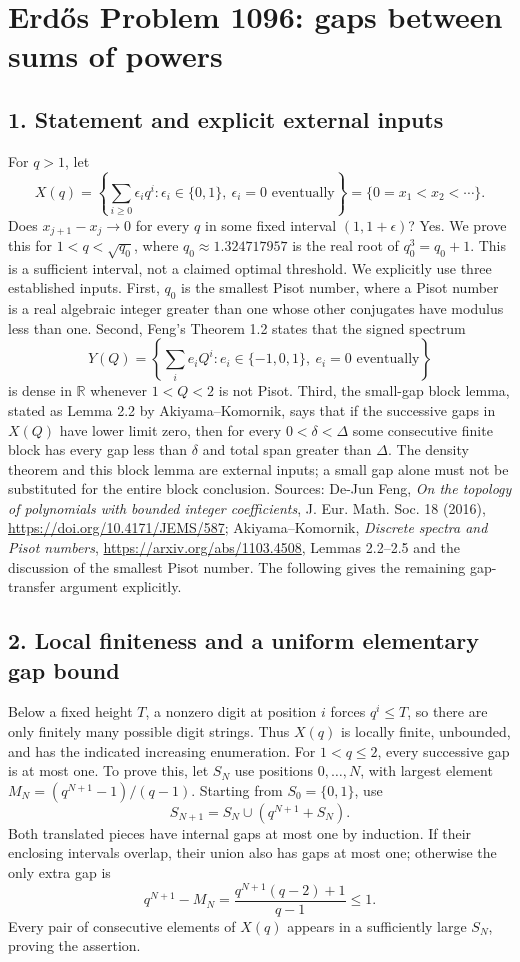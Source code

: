 \section*{Erd\H{o}s Problem 1096: gaps between sums of powers}
\subsection*{1. Statement and explicit external inputs}
For $q>1$, let
\[
 X(q)=\left\{\sum_{i\ge0}\epsilon_iq^i:\epsilon_i\in\{0,1\},\ \epsilon_i=0\text{ eventually}\right\}
 =\{0=x_1<x_2<\cdots\}.
\]
Does $x_{j+1}-x_j\to0$ for every $q$ in some fixed interval $(1,1+\epsilon)$? Yes. We prove this for $1<q<\sqrt{q_0}$, where $q_0\approx1.324717957$ is the real root of $q_0^3=q_0+1$. This is a sufficient interval, not a claimed optimal threshold.
We explicitly use three established inputs. First, $q_0$ is the smallest Pisot number, where a Pisot number is a real algebraic integer greater than one whose other conjugates have modulus less than one. Second, Feng's Theorem 1.2 states that the signed spectrum
\[
 Y(Q)=\left\{\sum_i e_iQ^i:e_i\in\{-1,0,1\},\ e_i=0\text{ eventually}\right\}
\]
is dense in $\mathbb R$ whenever $1<Q<2$ is not Pisot. Third, the small-gap block lemma, stated as Lemma 2.2 by Akiyama--Komornik, says that if the successive gaps in $X(Q)$ have lower limit zero, then for every $0<\delta<\Delta$ some consecutive finite block has every gap less than $\delta$ and total span greater than $\Delta$. The density theorem and this block lemma are external inputs; a small gap alone must not be substituted for the entire block conclusion.
Sources: De-Jun Feng, \emph{On the topology of polynomials with bounded integer coefficients}, J. Eur. Math. Soc. 18 (2016), \url{https://doi.org/10.4171/JEMS/587}; Akiyama--Komornik, \emph{Discrete spectra and Pisot numbers}, \url{https://arxiv.org/abs/1103.4508}, Lemmas 2.2--2.5 and the discussion of the smallest Pisot number. The following gives the remaining gap-transfer argument explicitly.

\subsection*{2. Local finiteness and a uniform elementary gap bound}
Below a fixed height $T$, a nonzero digit at position $i$ forces $q^i\le T$, so there are only finitely many possible digit strings. Thus $X(q)$ is locally finite, unbounded, and has the indicated increasing enumeration.
For $1<q\le2$, every successive gap is at most one. To prove this, let $S_N$ use positions $0,\ldots,N$, with largest element $M_N=(q^{N+1}-1)/(q-1)$. Starting from $S_0=\{0,1\}$, use
\[
 S_{N+1}=S_N\cup(q^{N+1}+S_N).
\]
Both translated pieces have internal gaps at most one by induction. If their enclosing intervals overlap, their union also has gaps at most one; otherwise the only extra gap is
\[
 q^{N+1}-M_N=\frac{q^{N+1}(q-2)+1}{q-1}\le1.
\]
Every pair of consecutive elements of $X(q)$ appears in a sufficiently large $S_N$, proving the assertion.

